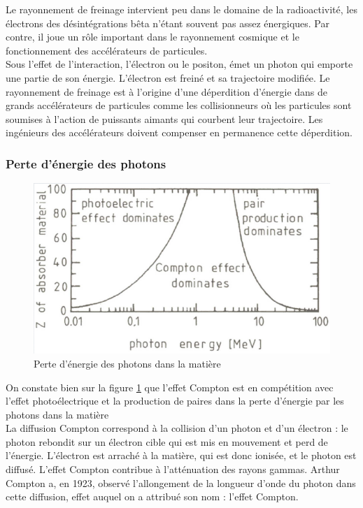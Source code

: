 Le rayonnement de freinage intervient peu dans le domaine de la radioactivité, les électrons des désintégrations bêta n'étant souvent pas assez énergiques. Par contre, il joue un rôle important dans le rayonnement cosmique et le fonctionnement des accélérateurs de particules. \\

Sous l’effet de l’interaction, l’électron ou le positon, émet un photon qui emporte une partie de son énergie. L’électron est freiné et sa trajectoire modifiée. Le rayonnement de freinage est à l’origine d’une déperdition d’énergie dans de grands accélérateurs de particules comme les collisionneurs où les particules sont soumises à l’action de puissants aimants qui courbent leur trajectoire. Les ingénieurs des accélérateurs doivent compenser en permanence cette déperdition.



\subsubsection{Perte d'énergie des photons}

\begin{figure}[ht]
    \centering
    \includegraphics[scale=0.60]{Images1/pertephotons.PNG}
    \caption{Perte d'énergie des photons dans la matière}
    \label{fig:pertes_energie_photos}
\end{figure}
On constate bien sur la figure \ref{fig:pertes_energie_photos} que l'effet Compton est en compétition avec l'effet photoélectrique et la production de paires dans la perte d'énergie par les photons dans la matière\\

La diffusion Compton correspond à la collision d’un photon et d’un électron : le photon rebondit sur un électron cible qui est mis en mouvement et perd de l’énergie. L'électron est arraché à la matière, qui est donc ionisée, et le photon est diffusé. L'effet Compton contribue à l'atténuation des rayons gammas.  Arthur Compton a, en 1923, observé l'allongement de la longueur d'onde du photon dans cette diffusion, effet auquel on a attribué son nom : l'effet Compton.

